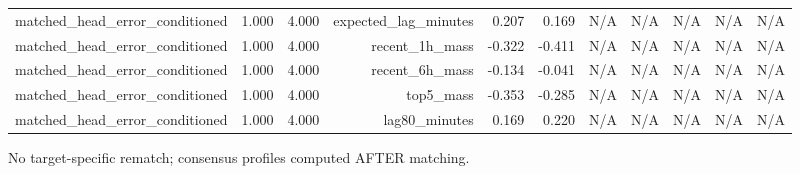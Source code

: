 \begin{table}[h!]
\begin{tabular}{lrrrrrrrrrr}
matched\_head\_error\_conditioned & 1.000 & 4.000 & expected\_lag\_minutes & 0.207 & 0.169 & N/A & N/A & N/A & N/A & N/A \\
matched\_head\_error\_conditioned & 1.000 & 4.000 & recent\_1h\_mass & -0.322 & -0.411 & N/A & N/A & N/A & N/A & N/A \\
matched\_head\_error\_conditioned & 1.000 & 4.000 & recent\_6h\_mass & -0.134 & -0.041 & N/A & N/A & N/A & N/A & N/A \\
matched\_head\_error\_conditioned & 1.000 & 4.000 & top5\_mass & -0.353 & -0.285 & N/A & N/A & N/A & N/A & N/A \\
matched\_head\_error\_conditioned & 1.000 & 4.000 & lag80\_minutes & 0.169 & 0.220 & N/A & N/A & N/A & N/A & N/A \\
\bottomrule
\end{tabular}
\vspace{4pt}
\footnotesize{No target-specific rematch; consensus profiles computed AFTER matching.}\\
\end{table}
